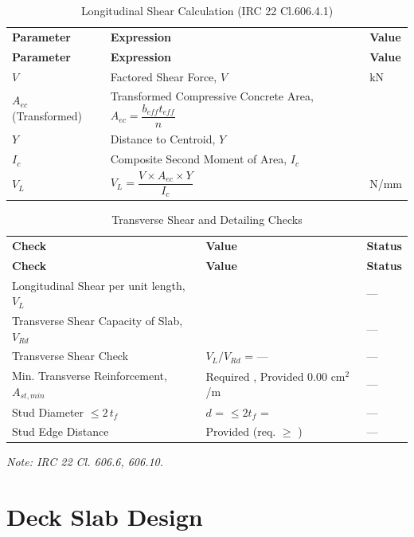 \documentclass[12pt,a4paper]{report}
\numberwithin{figure}{chapter}
\begin{document}
\begin{longtable}{|L{2.92cm}|L{7.31cm}|C{3.9cm}|}
\caption{Longitudinal Shear Calculation (IRC 22 Cl.606.4.1)}\\
\hline
\textbf{Parameter} & \textbf{Expression} & \textbf{Value} \\
\hline
\endfirsthead
\hline
\textbf{Parameter} & \textbf{Expression} & \textbf{Value} \\
\hline
\endhead
$V$ & \textnormal{Factored Shear Force, $V$} &  kN \\[6pt]
\hline
$A_{ec}$ {\small(Transformed)} & Transformed Compressive Concrete Area, $A_{ec}=\dfrac{b_{eff}t_{eff}}{n}$ &  \\[6pt]
\hline
$Y$ & \textnormal{Distance to Centroid, $Y$} &  \\[6pt]
\hline
$I_c$ & \textnormal{Composite Second Moment of Area, $I_c$} &  \\[6pt]
\hline
$V_L$ & $V_L=\dfrac{V\times A_{ec}\times Y}{I_c}$ &  N/mm \\[6pt]
\hline
\end{longtable}

\vspace{1em}
\begin{longtable}{|L{6.1cm}|L{4.64cm}|C{3.39cm}|}
\caption{Transverse Shear and Detailing Checks}\\
\hline
\textbf{Check} & \textbf{Value} & \textbf{Status} \\
\hline
\endfirsthead
\hline
\textbf{Check} & \textbf{Value} & \textbf{Status} \\
\hline
\endhead
Longitudinal Shear per unit length, $V_L$ &  & --- \\
\hline
Transverse Shear Capacity of Slab, $V_{Rd}$ &  & --- \\
\hline
Transverse Shear Check & $V_L/V_{Rd}$ = --- & --- \\
\hline
Min. Transverse Reinforcement, $A_{st,min}$ & Required , Provided 0.00 cm$^2$/m & --- \\
\hline
Stud Diameter $\leq 2\,t_f$ & $d$ =  $\leq 2t_f$ =  & --- \\
\hline
Stud Edge Distance & Provided  (req. $\geq$ ) & --- \\
\hline
\end{longtable}
\noindent\textit{Note: IRC 22 Cl. 606.6, 606.10.}

\section{Deck Slab Design}
\label{sec:deck-design}
\end{document}
